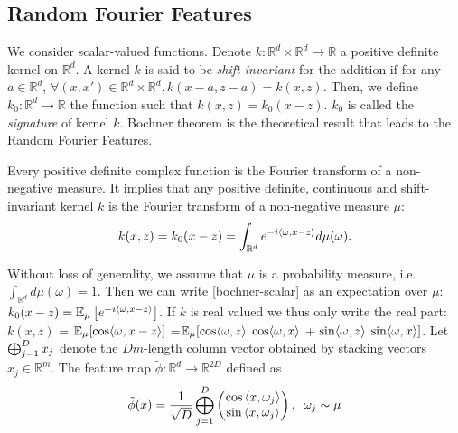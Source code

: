 \documentclass[twocolumn]{article}
\begin{document}
\subsection{Random Fourier Features}
We consider scalar-valued functions. Denote $k: \mathbb{R}^d \times
\mathbb{R}^d \rightarrow \mathbb{R}$ a positive definite kernel on
$\mathbb{R}^d$. A kernel $k$ is said to be \emph{shift-invariant} for the
addition if for any $a \in \mathbb{R}^d$, $ \forall (x,x') \in \mathbb{R}^d
\times \mathbb{R}^d, k(x-a,z-a) = k(x,z)$.  Then, we define $k_0: \mathbb{R}^d
\rightarrow \mathbb{R}$ the function such that $k(x,z)= k_0(x-z)$. $k_0$ is
called the \emph{signature} of kernel $k$. Bochner theorem is the theoretical
result that leads to the Random Fourier Features.
\begin{theorem}\label{th:bochner-scalar}
    Every positive definite complex function is the Fourier transform of a
    non-negative measure. It implies that any positive definite, continuous and
    shift-invariant kernel $k$ is the Fourier transform of a non-negative
    measure $\mu$:
    \begin{equation}\label{bochner-scalar}
        k(x,z)=k_0(x-z) = \int_{\mathbb{R}^d} e^{-i \langle\omega,x - z\rangle}
        d\mu(\omega).
    \end{equation}
\end{theorem}
Without loss of generality, we assume that $\mu$ is a probability measure, i.e.
$\int_{\mathbb{R}^d} d\mu(\omega)=1$.  Then we can write \cref{bochner-scalar}
as an expectation over $\mu$: $k_0(x-z) = {\mathbb{E}}_{\mu}\left[e^{-i
\langle\omega,x - z\rangle}\right]$.  If $k$ is real valued we thus only write the
real part: $k(x,z)$ = ${\mathbb{E}}_{\mu}[\cos \langle\omega,x - z\rangle]$
=${\mathbb{E}}_{\mu}[ \cos \langle\omega,z\rangle$ $\cos \langle\omega,x\rangle$ + $\sin
\langle\omega,z\rangle$ $\sin \langle\omega,x\rangle]$.  Let $\operatorname*{\bigoplus}_{j=1}^D x_j$ denote the
$Dm$-length column vector obtained by stacking vectors $x_j \in \mathbb{R}^m$.
The feature map $\tilde{\phi}: \mathbb{R}^d \rightarrow \mathbb{R}^{2D}$
defined as
\begin{equation}\label{eq:rff}
    \begin{aligned}
        \tilde{\phi}(x)=\frac{1}{\sqrt{D}}\operatorname*{\bigoplus}_{j=1}^D
        \begin{pmatrix}
            \cos{\langle x,\omega_j\rangle} \\ 
            \sin{\langle x,\omega_j\rangle}
        \end{pmatrix}, \enskip \omega_j \sim \mu
    \end{aligned}
\end{equation}
\end{document}
